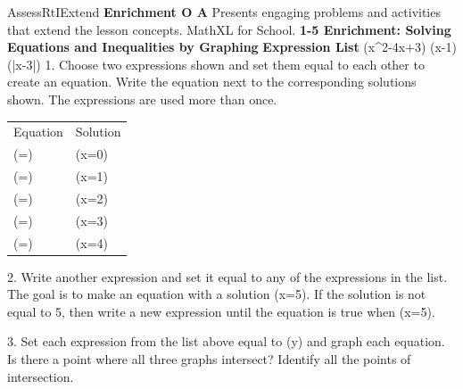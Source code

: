\documentclass{article}
\newenvironment{te-addendum}[2]{}{}     %
\newcommand{\answer}[1]{}               %
\newcommand{\placeholder}[2]{}          %
\begin{document}
\begin{te-addendum}{Assess}{RtIExtend}
\textbf{Enrichment O A}
Presents engaging problems and activities that extend the lesson concepts. MathXL for School.
\textbf{1-5 Enrichment: Solving Equations and Inequalities by Graphing}
\textbf{Expression List}
(x^2-4x+3) \qquad (x-1) \qquad (|x-3|)
1. Choose two expressions shown and set them equal to each other to create an equation. Write the equation next to the corresponding solutions shown. The expressions are used more than once.
\begin{tabular}{ll}
Equation & Solution \\
(\underline{\qquad}=\underline{\qquad}) & (x=0) \\
(\underline{\qquad}=\underline{\qquad}) & (x=1) \\
(\underline{\qquad}=\underline{\qquad}) & (x=2) \\
(\underline{\qquad}=\underline{\qquad}) & (x=3) \\
(\underline{\qquad}=\underline{\qquad}) & (x=4) \\
\end{tabular}
\answer{For (x=0): (|x-3|=x^2-4x+3). For (x=1): (x-1=x^2-4x+3). For (x=2): (|x-3|=x-1). For (x=3): (|x-3|=x^2-4x+3). For (x=4): (x-1=x^2-4x+3).}
2. Write another expression and set it equal to any of the expressions in the list. The goal is to make an equation with a solution (x=5). If the solution is not equal to 5, then write a new expression until the equation is true when (x=5).
\answer{Answers may vary. Sample answer: (x-1=2x-6); (x^2-4x+3=3x-7); (|x-3|=2x-8)}
3. Set each expression from the list above equal to (y) and graph each equation. Is there a point where all three graphs intersect? Identify all the points of intersection.
\answer{There is no point where all three graphs intersect. Two graphs intersect at point (0,3) and (3,0). Another two intersect at points (1,0) and (4,3). The final two graphs only intersect at point (2,1).}
\placeholder{graph}{Enrichment graph: magenta upward parabola y=x^2-4x+3 vertex (2,-1), line y=x-1, V y=|x-3| vertex (3,0). Unit grid with axes x,y and arrows, labels O and 4 on y. Window roughly x [-1,4], y [-1,4], intersections (0,3),(3,0),(1,0),(4,3),(2,1). Visible curve ends have arrows.}
\end{te-addendum}
\end{document}
